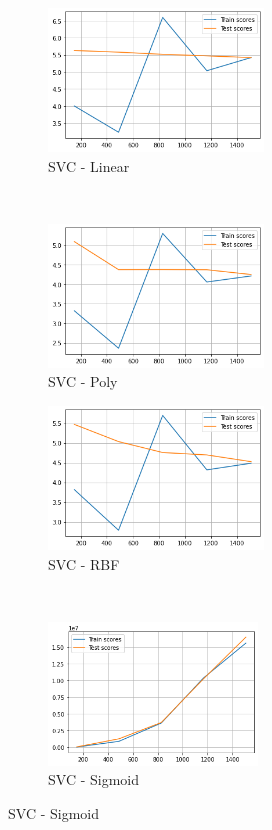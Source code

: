 \documentclass{article}
\begin{document}
\begin{figure}[htb!]
    \centering
    \begin{subfigure}[t]{0.5\textwidth}
        \centering
        \includegraphics[height=1.5in]{img/delta-regression/learning-curves/svc-linear}
        \caption{SVC - Linear}
    \end{subfigure}%
    ~ 
    \begin{subfigure}[t]{0.5\textwidth}
        \centering
        \includegraphics[height=1.5in]{img/delta-regression/learning-curves/svc-poly}
        \caption{SVC - Poly}
    \end{subfigure}

    \centering
    \begin{subfigure}[t]{0.5\textwidth}
        \centering
        \includegraphics[height=1.5in]{img/delta-regression/learning-curves/svc-rbf}
        \caption{SVC - RBF}
    \end{subfigure}%
    ~ 
    \begin{subfigure}[t]{0.5\textwidth}
        \centering
        \includegraphics[height=1.5in]{img/delta-regression/learning-curves/svc-sigmoid}
        \caption{SVC - Sigmoid}
    \end{subfigure}


\end{figure}
\end{document}
